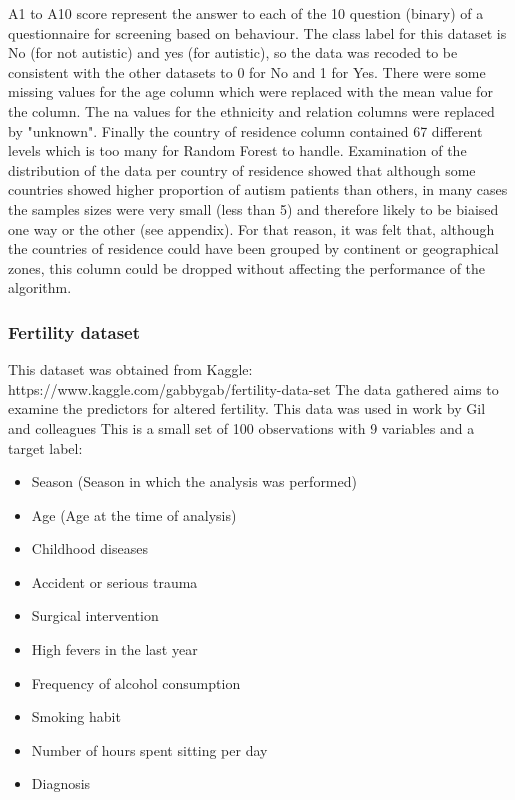 A1 to A10 score represent the answer to each of the 10 question (binary) of a questionnaire for screening based on behaviour. 
The class label for this dataset is No (for not autistic) and yes (for autistic), so the data was recoded to be consistent with the other datasets to 0 for No and 1 for Yes.
There were some missing values for the age column which were replaced with the mean value for the column. The na values for the ethnicity and relation columns were replaced by "unknown". Finally the country of residence column contained 67 different levels which is too many for Random Forest to handle.  Examination of the distribution of the data per country of residence showed that although some countries showed higher proportion of autism patients than others, in many cases the samples sizes were very small (less than 5) and therefore likely to be biaised one way or the other (see appendix). For that reason, it was felt that, although the countries of residence could have been grouped by continent or geographical zones, this column could be dropped without affecting the performance of the algorithm. 

\subsubsection{Fertility dataset}
This dataset was obtained from Kaggle:\newline
https://www.kaggle.com/gabbygab/fertility-data-set \newline
The data gathered aims to examine the predictors for altered fertility. This data was used in work by Gil and colleagues \cite{} This is a small set of 100 observations with 9 variables and a target label:
\begin{itemize}
    \item Season (Season in which the analysis was performed)
    \item Age (Age at the time of analysis)
    \item Childhood diseases
    \item Accident or serious trauma
    \item Surgical intervention
    \item High fevers in the last year
    \item Frequency of alcohol consumption
    \item Smoking habit
    \item Number of hours spent sitting per day
    \item Diagnosis
\end{itemize}







